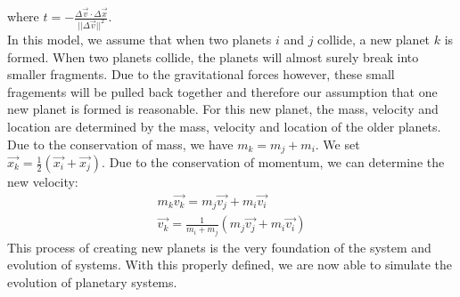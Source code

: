 where \(t= -\frac{\Delta\vec{v}\cdot \Delta\vec{x}}{||\Delta \vec{v}||^2}\).\\
In this model, we assume that when two planets \(i\) and \(j\) collide, a new planet \(k\) is formed. When two planets collide, the planets will almost surely break into smaller fragments. 
Due to the gravitational forces however, these small fragements will be pulled back together and therefore our assumption that one new planet is formed is reasonable.
For this new planet, the mass, velocity and location are determined by the mass, velocity and location of the older planets. 
Due to the conservation of mass, we have \(m_k=m_j+m_i\). We set \(\vec{x_k}=\frac{1}{2}(\vec{x_i}+\vec{x_j})\). Due to the conservation of momentum, we can determine the new velocity: 
\begin{align*}
	m_k\vec{v_k}=m_j\vec{v_j}+m_i\vec{v_i}\\
	\vec{v_k}=\frac{1}{m_i+m_j}(m_j\vec{v_j}+m_i\vec{v_i})
\end{align*}
This process of creating new planets is the very foundation of the system and evolution of systems. With this properly defined, we are now able to simulate the evolution of planetary systems.
